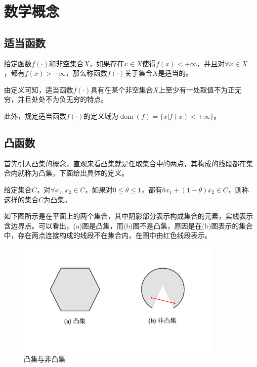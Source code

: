 \section{数学概念}

\subsection{适当函数}
\begin{definition}
    给定函数$f(\cdot)$和非空集合$X$，如果存在$x\in X$使得$f(x)< +\infty$，并且对$\forall x \in X$，都有$f(x) > -\infty$，那么称函数$f(\cdot)$关于集合$X$是适当的。\cite{2004Convex}
\end{definition}

由定义可知，适当函数$f(\cdot)$具有在某个非空集合$X$上至少有一处取值不为正无穷，并且处处不为负无穷的特点。

此外，规定适当函数$f(\cdot)$的定义域为$\mathop{\mathrm{dom}} (f) = \{x | f(x) < +\infty\}$。

\subsection{凸函数}
首先引入凸集的概念，直观来看凸集就是任取集合中的两点，其构成的线段都在集合内就称为凸集\cite{2004Convex}，下面给出具体的定义。

\begin{definition}
    给定集合$C$，对$\forall x_{1}, x_{2}\in C$，如果对$0 \leq \theta \leq 1$，都有$\theta x_{1}+(1-\theta)x_{2}\in C$，则称这样的集合$C$为凸集。
\end{definition}

如下图所示是在平面上的两个集合，其中阴影部分表示构成集合的元素，实线表示含边界点。可以看出，(a)图是凸集，而(b)图不是凸集，原因是在(b)图表示的集合中，存在两点连接构成的线段不在集合内，在图中由红色线段表示。

\begin{figure}[hbtp]
    \centering
    \includegraphics[width=100mm]{./Figures/convex_set_figure.png}
    \caption{凸集与非凸集}
    \label{figure_xlnx}
\end{figure}

